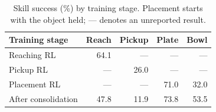 \begin{table}[!ht]
\caption{Skill success (\%) by training stage. Placement starts with the object held; --- denotes an unreported result.}
\label{tab:skill_matrix}\centering\small
\begin{tabular}{@{}lrrrr@{}}\toprule
Training stage & Reach & Pickup & Plate & Bowl\\\midrule
Reaching RL & 64.1 & --- & --- & ---\\
Pickup RL & --- & 26.0 & --- & ---\\
Placement RL & --- & --- & 71.0 & 32.0\\
After consolidation & 47.8 & 11.9 & 73.8 & 53.5\\\bottomrule
\end{tabular}
\end{table}
